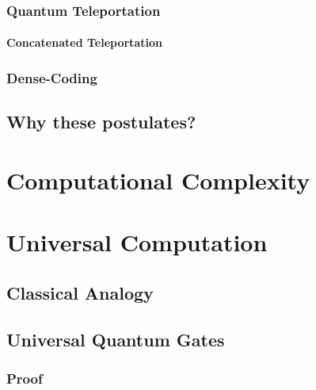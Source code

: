         \subsection{Quantum Teleportation} %

            \subsubsection{Concatenated Teleportation} %

        \subsection{Dense-Coding} %

    \section{Why these postulates?} %

\chapter{Computational Complexity} %

\chapter{Universal Computation} %

    \section{Classical Analogy} %

    \section{Universal Quantum Gates} %

        \subsection{Proof} %

